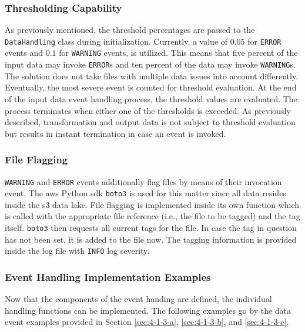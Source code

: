 \subsubsection{Thresholding Capability}
As previously mentioned, the threshold percentages are passed to the \texttt{DataHandling} class during initialization. Currently, a value of $0.05$ for \texttt{ERROR} events and $0.1$ for \texttt{WARNING} events, is utilized. This means that five percent of the input data may invoke \texttt{ERROR}s and ten percent of the data may invoke \texttt{WARNING}s. The solution does not take files with multiple data issues into account differently. Eventually, the most severe event is counted for threshold evaluation. At the end of the input data event handling process, the threshold values are evaluated. The process terminates when either one of the thresholds is exceeded. As previously described, transformation and output data is not subject to threshold evaluation but results in instant termination in case an event is invoked.

\subsubsection{File Flagging}
\texttt{WARNING} and \texttt{ERROR} events additionally flag files by means of their invocation event. The \ac{aws} Python \ac{sdk} \texttt{boto3} is used for this matter since all data resides inside the \ac{s3} data lake. File flagging is implemented inside its own function which is called with the appropriate file reference (i.e., the file to be tagged) and the tag itself. \texttt{boto3} then requests all current tags for the file. In case the tag in question has not been set, it is added to the file now. The tagging information is provided inside the log file with \texttt{INFO} log severity.

\subsubsection{Event Handling Implementation Examples}
Now that the components of the event handing are defined, the individual handling functions can be implemented. The following examples go by the data event examples provided in Section \ref{sec:4-1-3-a}, \ref{sec:4-1-3-b}, and \ref{sec:4-1-3-c}.

